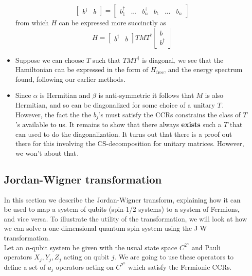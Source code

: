 \documentclass{book}
\theoremstyle{definition}
\newcommand{\al}{\alpha}
\newcommand{\be}{\beta}
\begin{document}
\begin{itemize}
\begin{equation}
 	\begin{bmatrix}
 	b^\dagger & b 
 	\end{bmatrix} = \begin{bmatrix}
 	b_1^\dagger& \dots & b_n^\dagger& b_1&\dots&b_n 
 	\end{bmatrix}
 	\end{equation}
 	from which $H$ can be expressed more succinctly as 
 	\begin{equation}
 	\boxed{H = \begin{bmatrix} b^\dagger & b\end{bmatrix}
 	TMT^\dagger 
 	\begin{bmatrix}
 	b\\b^\dagger
 	\end{bmatrix}}
 	\end{equation}
 	
 	
 	\item Suppose we can choose $T$ such that $TMT^\dagger$ is diagonal, we see that the Hamiltonian can be expressed in the form of $H_\text{free}$, and the energy spectrum found, following our earlier methods. 
 	
 	
 	\item Since $\al$ is Hermitian and $\be$ is anti-symmetric it follows that $M$ is also Hermitian, and so can be diagonalized for some choice of a unitary $T$. However, the fact the the $b_j$'s must satisfy the CCRs constrains the class of $T$'s available to us. It remains to show that there always \textbf{exists} such a $T$ that can used to do the diagonalization. It turns out that there is a proof out there for this involving the CS-decomposition for unitary matrices. However, we won't about that. 
\end{itemize}






\subsection{Jordan-Wigner transformation}
In this section we describe the Jordan-Wigner transform, explaining how it can be used to map a system of qubits (spin-1/2 systems) to a system of Fermions, and vice versa. To illustrate the utility of the transformation, we will look at how we can solve a one-dimensional quantum spin system using the J-W transformation. \\

Let an $n$-qubit system be given with the usual state space $C^{2^n}$ and Pauli operators $X_j, Y_j, Z_j$ acting on qubit $j$. We are going to use these operators to define a set of $a_j$ operators acting on $C^{2^n}$ which satisfy the Fermionic CCRs. \\
\end{document}
